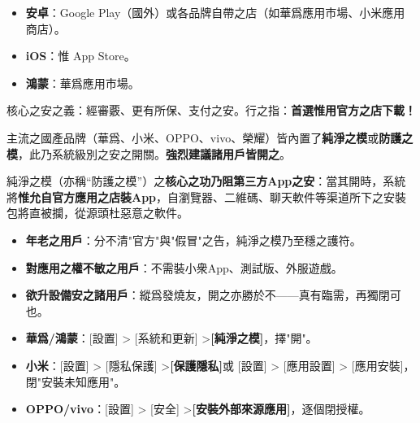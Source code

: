 


\begin{itemize}
  \item \textbf{安卓}：Google Play（國外）或各品牌自帶之店（如華爲應用市場、小米應用商店）。
  \item \textbf{iOS}：惟 App Store。
  \item \textbf{鴻蒙}：華爲應用市場。
\end{itemize}

核心之安之義：經審覈、更有所保、支付之安。行之指：\textbf{首選惟用官方之店下載！}


主流之國產品牌（華爲、小米、OPPO、vivo、榮耀）皆內置了\textbf{純淨之模}或\textbf{防護之模}，此乃系統級別之安之開關。\textbf{強烈建議諸用戶皆開之}。


純淨之模（亦稱“防護之模”）之\textbf{核心之功乃阻第三方App之安}：當其開時，系統將\textbf{惟允自官方應用之店裝App}，自瀏覽器、二維碼、聊天軟件等渠道所下之安裝包將直被攔，從源頭杜惡意之軟件。


\begin{itemize}
  \item \textbf{年老之用戶}：分不清"官方"與"假冒"之告，純淨之模乃至穩之護符。
  \item \textbf{對應用之權不敏之用戶}：不需裝小衆App、測試版、外服遊戲。
  \item \textbf{欲升設備安之諸用戶}：縱爲發燒友，開之亦勝於不——真有臨需，再獨閉可也。
\end{itemize}


\begin{itemize}
  \item \textbf{華爲/鴻蒙}：[設置] > [系統和更新] >\textbf{[純淨之模]}，擇"開"。
  \item \textbf{小米}：[設置] > [隱私保護] >\textbf{[保護隱私]}或 [設置] > [應用設置] > [應用安裝]，閉"安裝未知應用"。
  \item \textbf{OPPO/vivo}：[設置] > [安全] >\textbf{[安裝外部來源應用]}，逐個閉授權。
\end{itemize}

